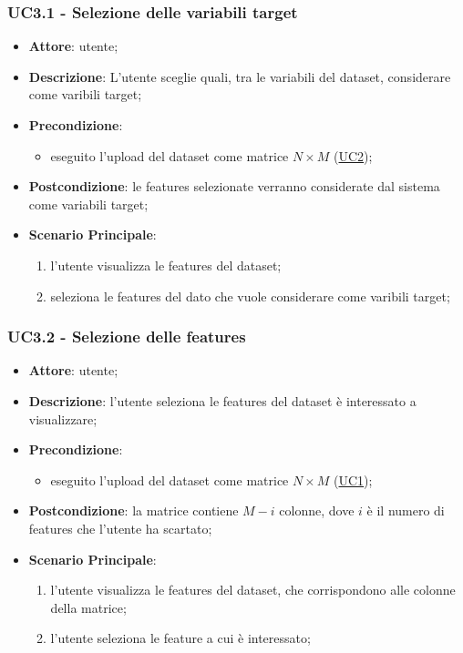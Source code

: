     \subsubsection{UC3.1 - Selezione delle variabili target}
    \label{uc3.1}
    \begin{itemize}
    \item \textbf{Attore}: utente;
    \item \textbf{Descrizione}: L'utente sceglie quali, tra le variabili del dataset, considerare come varibili target;
    \item \textbf{Precondizione}:
    \begin{itemize}
        \item eseguito l'upload del dataset come matrice $N\times M$ (\hyperref[uc2]{UC2});
    \end{itemize}
    \item \textbf{Postcondizione}: le features selezionate verranno considerate dal sistema come variabili target;
    \item \textbf{Scenario Principale}: 
    \begin{enumerate}
        \item l'utente visualizza le features del dataset;
        \item seleziona le features del dato che vuole considerare come varibili target;
    \end{enumerate}  
    \end{itemize}
    
    \subsubsection{UC3.2 - Selezione delle features}
    \label{uc3.2}

    \begin{itemize}
    \item \textbf{Attore}: utente;
    \item \textbf{Descrizione}: l'utente seleziona le features del dataset è interessato a visualizzare;
    \item \textbf{Precondizione}: 
     \begin{itemize}
        \item eseguito l'upload del dataset come matrice $N\times M$ (\hyperref[uc1]{UC1});
    \end{itemize}
    \item \textbf{Postcondizione}: la matrice contiene $M-i$ colonne, dove $i$ è il numero di features che l'utente ha scartato;
    \item \textbf{Scenario Principale}: 
    \begin{enumerate}
        \item l'utente visualizza le features del dataset, che corrispondono alle colonne della matrice;
        \item l'utente seleziona le feature a cui è interessato;
    \end{enumerate}
    \end{itemize}
    
